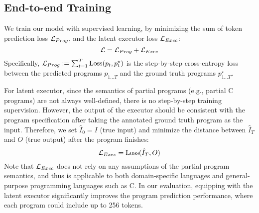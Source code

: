 \subsection{End-to-end Training}
\vspace{-0.1in}
We train our model with supervised learning, by minimizing the sum of token prediction loss $\mathcal{L}_{Prog}$, and the latent executor loss $\mathcal{L}_{Exec}$: 
\begin{equation}
\mathcal{L}=\mathcal{L}_{Prog} + \mathcal{L}_{Exec}
\end{equation}
Specifically, $\mathcal{L}_{Prog} :=\sum_{t=1}^T\mathrm{Loss}(p_t, p^\star_t)$ is the step-by-step cross-entropy loss between the predicted programs $p_{1\ldots T}$ and the ground truth programs $p^\star_{1\ldots T}$.

For latent executor, since the semantics of partial programs (e.g., partial C programs) are not always well-defined, there is no step-by-step training supervision. However, the output of the executor should be consistent with the program specification after taking the annotated ground truth program as the input. Therefore, we set $\hat I_0 = I$ (true input) and minimize the distance between $\hat I_T$ and $O$ (true output) after the program finishes:
\begin{equation}
\mathcal{L}_{Exec}=\mathrm{Loss}(\hat{I}_T, O)
\end{equation}
Note that $\mathcal{L}_{Exec}$ does not rely on any assumptions of the partial program semantics, and thus is applicable to both domain-specific languages and general-purpose programming languages such as C. In our evaluation, equipping with the latent executor significantly improves the program prediction performance, where each program could include up to 256 tokens.   

\def\cD{\mathcal{D}}

